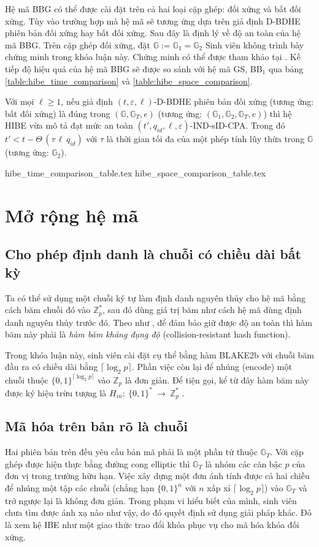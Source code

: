 \documentclass[class=report, crop=false]{standalone}
\begin{document}
		Hệ mã BBG có thể được cài đặt trên cả hai loại cặp ghép: đối xứng và bất đối xứng. Tùy vào trường hợp mà hệ mã sẽ tương ứng dựa trên giả định D-BDHE phiên bản đối xứng hay bất đối xứng. Sau đây là định lý về độ an toàn của hệ mã BBG. Trên cặp ghép đối xứng, đặt $\mathbb{G} := \mathbb{G}_1 = \mathbb{G}_2$ Sinh viên không trình bày chứng minh trong khóa luận này. Chứng minh có thể được tham khảo tại \cite{DBLP:conf/eurocrypt/BonehBG05}. Kế tiếp độ hiệu quả của hệ mã BBG sẽ được so sánh với hệ mã GS, BB$_1$ qua bảng \ref{table:hibe_time_comparison} và \ref{table:hibe_space_comparison}.
		\begin{theorem}
			Với mọi $\ell \geq 1$, nếu giả định $(t, \varepsilon, \ell)$-D-BDHE phiên bản đối xứng (tương ứng: bất đối xứng) là đúng trong $(\mathbb{G}, \mathbb{G}_T, e)$ (tương ứng: $(\mathbb{G}_1, \mathbb{G}_2, \mathbb{G}_T, e)$) thì hệ HIBE vừa mô tả đạt mức an toàn $(t', q_{id}, \ell, \varepsilon)$-IND-sID-CPA. Trong đó $t' < t - \Theta\,(\tau\, \ell\, q_{id})$ với $\tau$ là thời gian tối đa của một phép tính lũy thừa trong $\mathbb{G}$ (tương ứng: $\mathbb{G}_2$).
		\end{theorem}
		\newpage
		{hibe_time_comparison_table.tex}
		{hibe_space_comparison_table.tex}
	\section{Mở rộng hệ mã}
		\subsection{Cho phép định danh là chuỗi có chiều dài bất kỳ}
			Ta có thể sử dụng một chuỗi ký tự làm định danh nguyên thủy cho hệ mã bằng cách băm chuỗi đó vào $\mathbb{Z}_p^*$, sau đó dùng giá trị băm như cách hệ mã dùng định danh nguyên thủy trước đó. Theo như \cite[mục 3.1]{DBLP:conf/eurocrypt/BonehBG05}, để đảm bảo giữ được độ an toàn thì hàm băm này phải là \textit{hàm băm kháng đụng độ} (collision-resistant hash function).

			Trong khóa luận này, sinh viên cài đặt cụ thể bằng hàm BLAKE2b \cite{DBLP:conf/acns/AumassonNWW13} với chuỗi băm đầu ra có chiều dài bằng $\lceil \log_2 p \rceil$. Phần việc còn lại để nhúng (encode) một chuỗi thuộc $\{0, 1\}^{\lceil \log_2 p \rceil}$ vào $\mathbb{Z}_p$ là đơn giản. Để tiện gọi, kể từ đây hàm băm này được ký hiệu trừu tượng là $H_{in}: 	\ \{0, 1 \}^* \ \rightarrow \ \mathbb{Z}_p^*$ .
		\subsection{Mã hóa trên bản rõ là chuỗi}
			Hai phiên bản trên đều yêu cầu bản mã phải là một phần tử thuộc $\mathbb{G}_T$. Với cặp ghép được hiện thực bằng đường cong elliptic thì $\mathbb{G}_T$ là nhóm các căn bậc $p$ của đơn vị trong trường hữu hạn. Việc xây dựng một đơn ánh tính được cả hai chiều để nhúng một tập các chuỗi (chẳng hạn $\{0, 1\}^n$ với $n$ xấp xỉ $\lceil \log_2 p \rceil$) vào $\mathbb{G}_T$ và trở ngược lại là không đơn giản. Trong phạm vi hiểu biết của mình, sinh viên chưa tìm được ánh xạ nào như vậy, do đó quyết định sử dụng giải pháp khác. Đó là xem hệ IBE như một giao thức trao đổi khóa phục vụ cho mã hóa khóa đối xứng.
\end{document}
